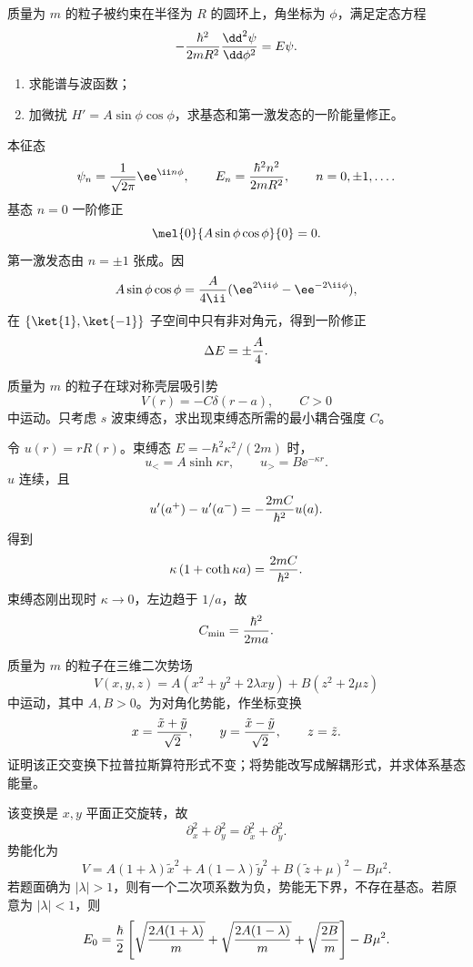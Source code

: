 \begin{question}
质量为 $m$ 的粒子被约束在半径为 $R$ 的圆环上，角坐标为 $\phi$，满足定态方程
\[
  -{\hbar^2\over2mR^2}{\dd^2\psi\over\dd\phi^2}=E\psi.
\]
\begin{enumerate}
  \item 求能谱与波函数；
  \item 加微扰 $H'=A\sin\phi\cos\phi$，求基态和第一激发态的一阶能量修正。
\end{enumerate}
\begin{solution}
本征态
\[
  \psi_n={1\over\sqrt{2\pi}}\ee^{\ii n\phi},
  \qquad E_n={\hbar^2n^2\over2mR^2},
  \qquad n=0,\pm1,\ldots .
\]
基态 $n=0$ 一阶修正
\[
  \mel{0}{A\sin\phi\cos\phi}{0}=0.
\]
第一激发态由 $n=\pm1$ 张成。因
\[
  A\sin\phi\cos\phi={A\over4\ii}(\ee^{2\ii\phi}-\ee^{-2\ii\phi}),
\]
在 $\{\ket{1},\ket{-1}\}$ 子空间中只有非对角元，得到一阶修正
\[
  \Delta E=\pm {A\over4}.
\]
\end{solution}
\end{question}

\begin{question}
质量为 $m$ 的粒子在球对称壳层吸引势
\[
  V(r)=-C\delta(r-a),\qquad C>0
\]
中运动。只考虑 $s$ 波束缚态，求出现束缚态所需的最小耦合强度 $C$。
\begin{solution}
令 $u(r)=rR(r)$。束缚态 $E=-\hbar^2\kappa^2/(2m)$ 时，
\[
  u_< =A\sinh\kappa r,
  \qquad u_>=B\ee^{-\kappa r}.
\]
$u$ 连续，且
\[
  u'(a^+)-u'(a^-)=-{2mC\over\hbar^2}u(a).
\]
得到
\[
  \kappa\left(1+\coth\kappa a\right)={2mC\over\hbar^2}.
\]
束缚态刚出现时 $\kappa\to0$，左边趋于 $1/a$，故
\[
  C_{\min}={\hbar^2\over2ma}.
\]
\end{solution}
\end{question}

\begin{question}
质量为 $m$ 的粒子在三维二次势场
\[
  V(x,y,z)=A(x^2+y^2+2\lambda xy)+B(z^2+2\mu z)
\]
中运动，其中 $A,B>0$。为对角化势能，作坐标变换
\[
  x={\tilde x+\tilde y\over\sqrt2},\qquad y={\tilde x-\tilde y\over\sqrt2},\qquad z=\tilde z.
\]
证明该正交变换下拉普拉斯算符形式不变；将势能改写成解耦形式，并求体系基态能量。
\begin{solution}
该变换是 $x,y$ 平面正交旋转，故
\[
  \partial_x^2+\partial_y^2=\partial_{\tilde x}^2+\partial_{\tilde y}^2.
\]
势能化为
\[
  V=A(1+\lambda)\tilde x^2+A(1-\lambda)\tilde y^2+B(\tilde z+\mu)^2-B\mu^2.
\]
若题面确为 $|\lambda|>1$，则有一个二次项系数为负，势能无下界，不存在基态。若原意为 $|\lambda|<1$，则
\[
  E_0={\hbar\over2}\left[\sqrt{2A(1+\lambda)\over m}+\sqrt{2A(1-\lambda)\over m}+\sqrt{2B\over m}\right]-B\mu^2.
\]
\end{solution}
\end{question}


